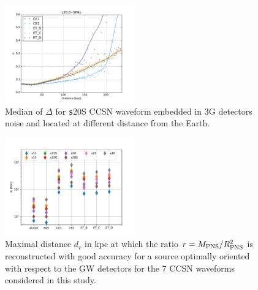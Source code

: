 \begin{figure}
  \centering
  \includegraphics[width=0.5\textwidth]{plots/s20--SFHo_all3G}
  \caption{Median of $\Delta$ for {\texttt s20S} CCSN waveform embedded in 3G detectors noise and located at different distance from the Earth. } \label{fig:s20--SFHo_all3G}
\end{figure}

\begin{figure}
  \centering
  \includegraphics[width=0.5\textwidth]{plots/dist_allwvfs_2G3G}
  \caption{Maximal distance $d_{r}$ in kpc at which the ratio $r=M_{\rm PNS}/R_{\rm PNS}^2$ is reconstructed
    with good accuracy for a source optimally oriented with respect to the GW detectors for the 7 CCSN waveforms considered in this study.} \label{fig:distances}
\end{figure}



